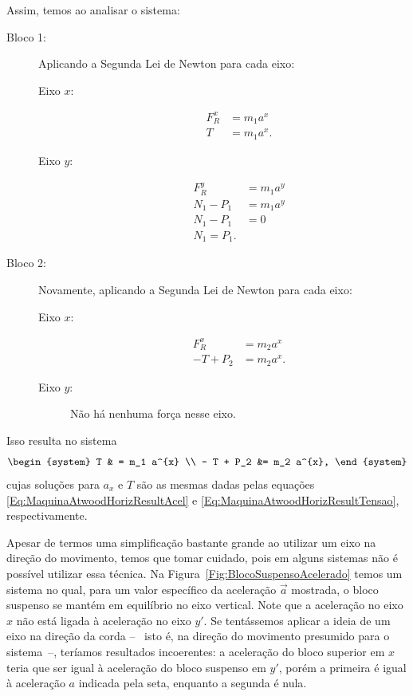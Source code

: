 Assim, temos ao analisar o sistema:
\begin{description}
    \item[Bloco 1:] Aplicando a Segunda Lei de Newton para cada eixo:
        \begin{description}
            \item[Eixo $x$:]
                \begin{align}
                    F_R^{x} &= m_1 a^{x} \\
                    T & = m_1 a^{x}.
                \end{align}
            \item[Eixo $y$:]
                \begin{align}
                    F_R^{y} &= m_1 a^{y} \\
                    N_1 - P_1 &= m_1 a^{y} \\
                    N_1 - P_1 &= 0 \\
                    N_1 = P_1.
                \end{align}
        \end{description}
    \item[Bloco 2:] Novamente, aplicando a Segunda Lei de Newton para cada eixo:
        \begin{description}
            \item[Eixo $x$:]
                \begin{align}
                    F_R^{x} &= m_2 a^{x} \\
                    - T + P_2 &= m_2 a^{x}.
                \end{align}
            \item[Eixo $y$:] Não há nenhuma força nesse eixo.
        \end{description}
\end{description}


\noindent{}Isso resulta no sistema
\begin{equation}
\begin{system}
    T & = m_1 a^{x} \\
    - T + P_2 &= m_2 a^{x},
\end{system}
\end{equation}
%
cujas soluções para $a_x$ e $T$ são as mesmas dadas pelas equações \eqref{Eq:MaquinaAtwoodHorizResultAcel} e \eqref{Eq:MaquinaAtwoodHorizResultTensao}, respectivamente.

Apesar de termos uma simplificação bastante grande ao utilizar um eixo na direção do movimento, temos que tomar cuidado, pois em alguns sistemas não é possível utilizar essa técnica. Na Figura~\ref{Fig:BlocoSuspensoAcelerado} temos um sistema no qual, para um valor específico da aceleração $\vec{a}$ mostrada, o bloco suspenso se mantém em equilíbrio no eixo vertical. Note que a aceleração no eixo $x$ não está ligada à aceleração no eixo $y'$. Se tentássemos aplicar a ideia de um eixo na direção da corda --~ isto é, na direção do movimento presumido para o sistema~--, teríamos resultados incoerentes: a aceleração do bloco superior em $x$ teria que ser igual à aceleração do bloco suspenso em $y'$, porém a primeira é igual à aceleração $a$ indicada pela seta, enquanto a segunda é nula.

